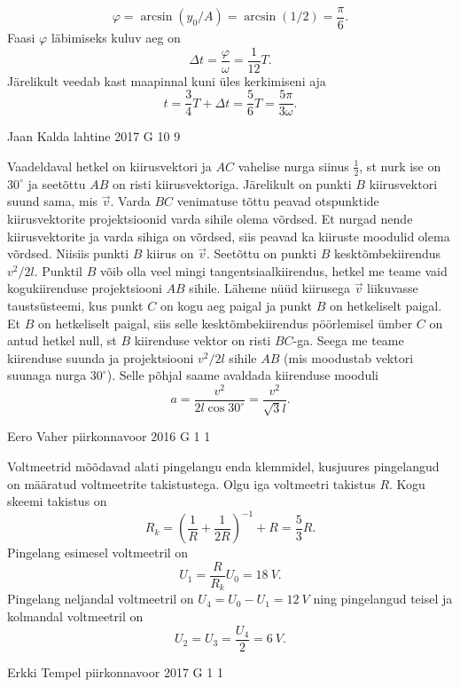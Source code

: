 \documentclass[11pt, twoside]{article}
\begin{document}
{{\[
\varphi = \arcsin(y_0/A) = \arcsin(1/2) = \frac{\pi}{6}.
\]
Faasi $\varphi$ läbimiseks kuluv aeg on
\[
\Delta t = \frac{\varphi}{\omega}=\frac{1}{12}T.
\]
Järelikult veedab kast maapinnal kuni üles kerkimiseni aja
\[
t = \frac{3}{4}T + \Delta t = \frac{5}{6}T = \frac{5\pi}{3\omega}.
\]
\fi
}

{Jaan Kalda} %
{lahtine} %
{2017} %
{G 10} %
{9} %
{

\ifSolution
Vaadeldaval hetkel on kiirusvektori ja $AC$ vahelise nurga siinus $\frac 12$, st nurk ise on $30^\circ$ ja seetõttu $AB$ on risti kiirusvektoriga. Järelikult on punkti $B$ kiirusvektori suund sama, mis $\vec v$. Varda $BC$ venimatuse tõttu peavad otspunktide kiirusvektorite projektsioonid varda sihile olema võrdsed. Et nurgad nende kiirusvektorite ja varda sihiga on võrdsed, siis peavad ka kiiruste moodulid olema võrdsed. Niisiis punkti $B$ kiirus on $\vec v$. Seetõttu on punkti $B$ kesktõmbekiirendus $v^2/2l$. Punktil $B$ võib olla veel mingi tangentsiaalkiirendus, hetkel me teame vaid kogukiirenduse projektsiooni $AB$ sihile. Läheme nüüd kiirusega $\vec v$ liikuvasse taustsüsteemi, kus punkt $C$ on kogu aeg paigal ja punkt $B$ on hetkeliselt paigal. Et $B$ on hetkeliselt paigal, siis selle kesktõmbekiirendus pöörlemisel ümber $C$ on antud hetkel null, st $B$ kiirenduse vektor on risti $BC$-ga. Seega me teame kiirenduse suunda ja projektsiooni $v^2/2l$ sihile $AB$ (mis moodustab vektori suunaga nurga $30^\circ$). Selle põhjal saame avaldada kiirenduse mooduli
\[
a=\frac{v^2}{2l\cos30^\circ}=\frac{v^2}{\sqrt 3l}.
\]
\fi
}

{Eero Vaher} %
{piirkonnavoor} %
{2016} %
{G 1} %
{1} %
{

\ifSolution
Voltmeetrid mõõdavad alati pingelangu enda klemmidel, kusjuures pingelangud on määratud voltmeetrite takistustega. Olgu iga voltmeetri takistus $R$. Kogu skeemi takistus on 
\[
R_k=\left(\frac{1}{R}+\frac{1}{2R}\right)^{-1}+R=\frac{5}{3}R.
\]
Pingelang esimesel voltmeetril on
\[
U_1=\frac{R}{R_k}U_0=\SI{18}{V}.
\]
Pingelang neljandal voltmeetril on $U_4=U_0-U_1=\SI{12}{V}$ ning pingelangud teisel ja kolmandal voltmeetril on 
\[
U_2=U_3=\frac{U_4}{2}=\SI{6}{V}.
\]
\fi
}

{Erkki Tempel} %
{piirkonnavoor} %
{2017} %
{G 1} %
{1} %
{

}}
\end{document}

